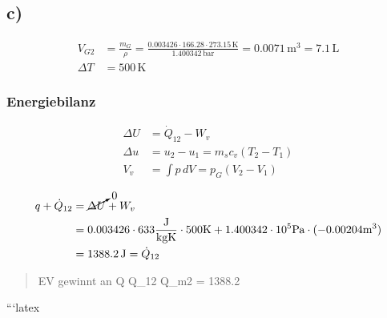 

\subsection*{c)}
\begin{align*}
V_{G2} &= \frac{m_{G}}{\rho} = \frac{0.003426 \cdot 166.28 \cdot 273.15 \, \text{K}}{1.400342 \, \text{bar}} = 0.0071 \, \text{m}^3 = 7.1 \, \text{L} \\
\Delta T &= 500 \, \text{K}
\end{align*}

\subsubsection*{Energiebilanz}
\begin{align*}
\Delta U &= \dot{Q}_{12} - W_v \\
\Delta u &= u_2 - u_1 = m_s c_v (T_2 - T_1) \\
V_v &= \int p \, dV = p_G (V_2 - V_1)
\end{align*}

\begin{align*}
q + \dot{Q}_{12} &= \cancelto{0}{\Delta U} + W_v \\
&= 0.003426 \cdot 633 \frac{\text{J}}{\text{kgK}} \cdot 500 \text{K} + 1.400342 \cdot 10^5 \text{Pa} \cdot (-0.00204 \text{m}^3) \\
&= 1388.2 \, \text{J} = \dot{Q}_{12}
\end{align*}

\begin{quote}
EV gewinnt an Q \Rightarrow Q_{12}  \Rightarrow Q_{m2} = 1388.2 \, 
\end{quote}```latex